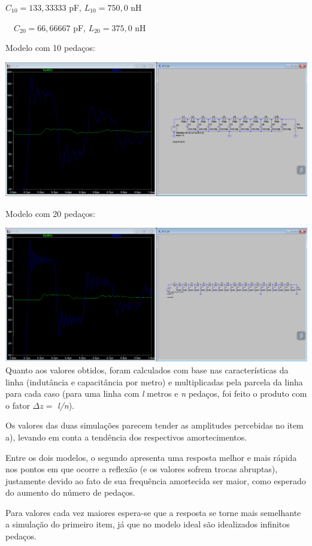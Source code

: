 \documentclass[12pt,a4paper]{article}
\begin{document}
$C_{10}=133,33333$ pF,
$L_{10}=750,0$ nH

\ \ $C_{20}=66,66667$ pF,
$L_{20}=375,0$ nH

    {\centering Modelo com 10 pedaços:\\}

    \hspace{-1.5cm} \includegraphics[scale=0.35]{Q2 item b 10.png}

\break

    {\centering Modelo com 20 pedaços:\\}

    \hspace{-1.5cm} \includegraphics[scale=0.35]{Q2 item b 20.png} \\

Quanto aos valores obtidos, foram calculados com base nas características da linha (indutância e capacitância por metro) e multiplicadas pela parcela da linha para cada caso (para uma linha com \textit{l} metros e \textit{n} pedaços, foi feito o produto com o fator $\Delta z=$ \textit{l/n}).

Os valores das duas simulações parecem tender as amplitudes percebidas no item a), levando em conta a tendência dos respectivos amortecimentos.

Entre os dois modelos, o segundo apresenta uma resposta melhor e mais rápida nos pontos em que ocorre a reflexão (e os valores sofrem trocas abruptas), justamente devido ao fato de sua frequência amortecida ser maior, como esperado do aumento do número de pedaços.

Para valores cada vez maiores espera-se que a resposta se torne mais semelhante a simulação do primeiro item, já que no modelo ideal são idealizados infinitos pedaços.
\end{document}

